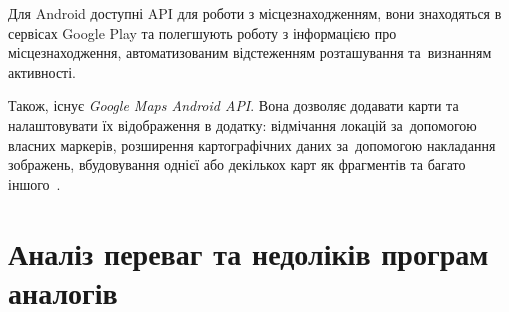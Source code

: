 \documentclass[../main.tex]{subfiles}
\begin{document}
Для Android доступні API для роботи з місцезнаходженням, вони знаходяться в сервісах Google Play та полегшують роботу з інформацією про місцезнаходження, автоматизованим відстеженням розташування та~визнанням активності. 

Також, існує \textit{Google Maps Android API}. Вона дозволяє додавати карти та налаштовувати їх відображення в додатку: відмічання локацій за~допомогою власних маркерів, розширення картографічних даних за~допомогою накладання зображень, вбудовування однієї або декількох карт як фрагментів та багато іншого~\cite{google_maps}.

\section{Аналіз переваг та недоліків програм аналогів}
\end{document}
